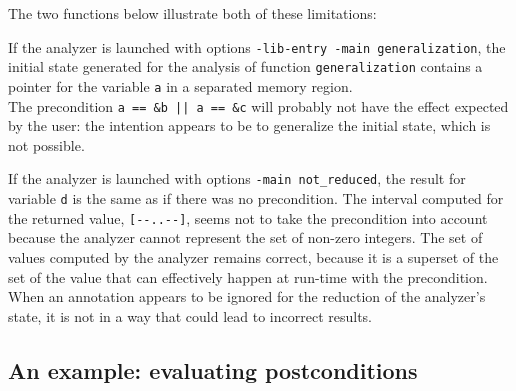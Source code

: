 \documentclass{frama-c-book}
\begin{document}
The two functions below illustrate both of these limitations:

If the analyzer is launched with
options \lstinline|-lib-entry -main generalization|,
the initial state generated for the analysis of function
\lstinline|generalization| contains a pointer for the variable \lstinline|a| in a separated memory region.\\
The precondition
\lstinline$a == &b || a == &c$ will probably not have the effect
expected by the user: the intention appears to be to generalize
the initial state, which is not possible.

If the analyzer is launched with
options \lstinline|-main not_reduced|,
the result for variable \lstinline|d| is the same as if there was no
precondition. The interval computed for the returned
value, \lstinline|[--..--]|,
seems not to take the precondition into account because the analyzer
cannot represent the set of non-zero integers.
The set of values computed by the analyzer remains correct, because
it is a superset of the set of the value that can effectively
happen at run-time with the precondition. When an annotation appears to
be ignored for the reduction of the analyzer's state, it is not in
a way that could lead to incorrect results.


\subsection{An example: evaluating postconditions}
\label{sec:evaluating-postconditions}
\end{document}
